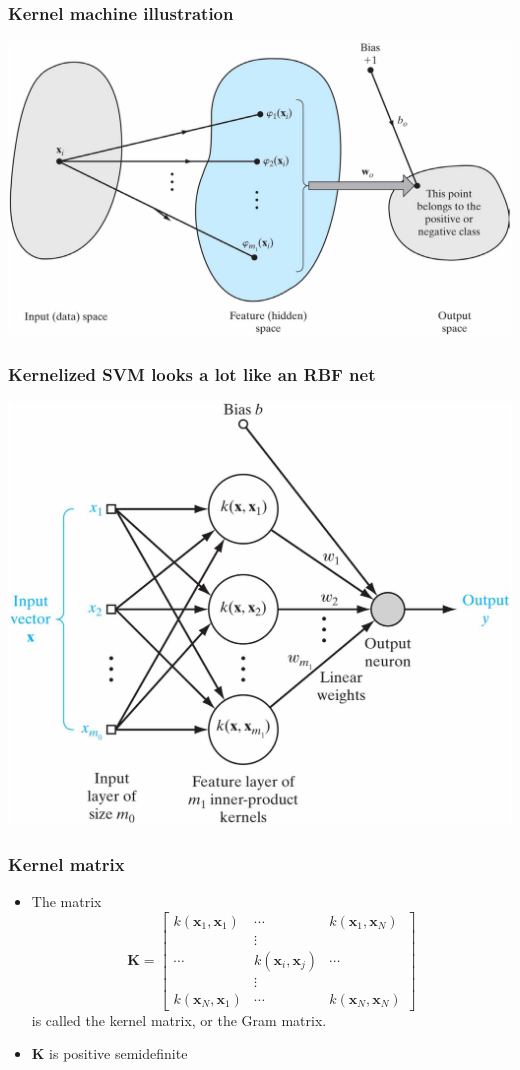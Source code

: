 \documentclass[12pt,notes,mathserif]{beamer}
\begin{document}
\begin{frame}[c]
\frametitle{Kernel machine illustration}
\begin{center}
\includegraphics[width=0.7\linewidth]{fig10/lec104.jpg}
\end{center}
\end{frame}

\begin{frame}[c]
\frametitle{Kernelized SVM looks a lot like an RBF net}
\begin{center}
\includegraphics[width=0.7\linewidth]{fig10/lec105.jpg}
\end{center}
\end{frame}

\begin{frame}[c]
\frametitle{Kernel matrix}
\begin{itemize}
\item The matrix
\[
\mathbf{K}=
\begin{bmatrix}
k(\mathbf{x}_1,\mathbf{x}_1)&\cdots&k(\mathbf{x}_1,\mathbf{x}_N)\\
&\vdots&\\
\cdots&k(\mathbf{x}_i,\mathbf{x}_j)&\cdots\\
&\vdots&\\
k(\mathbf{x}_N,\mathbf{x}_1)&\cdots&k(\mathbf{x}_N,\mathbf{x}_N)
\end{bmatrix}
\]
is called the kernel matrix, or the Gram matrix.
\item $\mathbf{K}$ is positive semidefinite
\end{itemize}
\end{frame}
\end{document}
